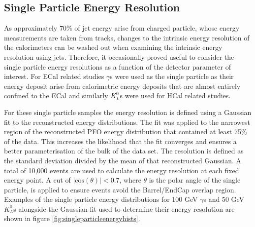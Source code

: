 \subsection{Single Particle Energy Resolution}
As approximately $70\%$ of jet energy arise from charged particle, whose energy measurements are taken from tracks, changes to the intrinsic energy resolution of the calorimeters can be washed out when examining the intrinsic energy resolution using jets.  Therefore, it occasionally proved useful to consider the single particle energy resolutions as a function of the detector parameter of interest.  For ECal related studies $\gamma$s were used as the single particle as their energy deposit arise from calorimetric energy deposits that are almost entirely confined to the ECal and similarly $K^{0}_{L}$s were used for HCal related studies.  

For these single particle samples the energy resolution is defined using a Gaussian fit to the reconstructed energy distributions.  The fit was applied to the narrowest region of the reconstructed PFO energy distribution that contained at least 75\% of the data.  This increases the likelihood that the fit converges and ensures a better parameterisation of the bulk of the data set.  The resolution is defined as the standard deviation divided by the mean of that reconstructed Gaussian.  A total of 10,000 events are used to calculate the energy resolution at each fixed energy point.  A cut of $|\text{cos}(\theta)| < 0.7$, where $\theta$ is the polar angle of the single particle, is applied to ensure events avoid the Barrel/EndCap overlap region.  Examples of the single particle energy distributions for 100 GeV $\gamma$s and 50 GeV $K^{0}_{L}$s alongside the Gaussian fit used to determine their energy resolution are shown in figure \ref{fig:singleparticleenergyhists}.

